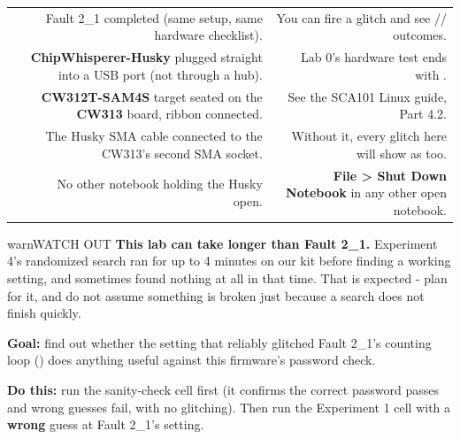 \documentclass[11pt,letterpaper]{article}
\begin{document}
{\small{}
\begin{longtable}{|R{0.0652}|R{0.5217}|R{0.4130}|}
\hline
{}\hdrcell{} &  &  \\ \hline
\endhead
[  ] & Fault 2\_1 completed (same setup, same hardware checklist). & You can fire a glitch and see // outcomes. \\ \hline
[  ] & \textbf{ChipWhisperer-Husky} plugged straight into a USB port (not through a hub). & Lab 0's hardware test ends with . \\ \hline
[  ] & \textbf{CW312T-SAM4S} target seated on the \textbf{CW313} board, ribbon connected. & See the SCA101 Linux guide, Part 4.2. \\ \hline
[  ] & The Husky \textbf{} SMA cable connected to the CW313's second SMA socket. & Without it, every glitch here will show as  too. \\ \hline
[  ] & No other notebook holding the Husky open. & \textbf{File \textgreater{} Shut Down Notebook} in any other open notebook. \\ \hline
\end{longtable}}

\vspace{4pt}

\begin{guidecallout}{warn}{WATCH OUT}
\textbf{This lab can take longer than Fault 2\_1.} Experiment 4's randomized search ran for up to 4 minutes on our kit
before finding a working setting, and sometimes found nothing at all in that time. That is expected - plan for it, and
do not assume something is broken just because a search does not finish quickly.
\end{guidecallout}


\textbf{Goal:} find out whether the setting that reliably glitched Fault 2\_1's counting loop () does anything useful against this firmware's password check.

\textbf{Do this:} run the sanity-check cell first (it confirms the correct password  passes and wrong
guesses fail, with no glitching). Then run the Experiment 1 cell with a \textbf{wrong} guess at Fault 2\_1's setting.
\end{document}
